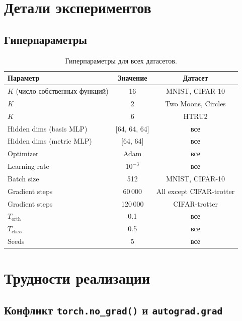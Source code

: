 \documentclass[14pt, a4paper, oneside]{extreport}
\theoremstyle{plain}
\theoremstyle{definition}
\begin{document}
\chapter{Детали экспериментов}
\label{app:experiments}

\section{Гиперпараметры}

\begin{table}[h]
  \centering
  \caption{Гиперпараметры для всех датасетов.}
  \begin{tabular}{lcc}
    \toprule
    Параметр & Значение & Датасет \\
    \midrule
    $K$ (число собственных функций) & 16 & MNIST, CIFAR-10 \\
    $K$ & 2 & Two Moons, Circles \\
    $K$ & 6 & HTRU2 \\
    Hidden dims (basis MLP) & [64, 64, 64] & все \\
    Hidden dims (metric MLP) & [64, 64] & все \\
    Optimizer & Adam & все \\
    Learning rate & $10^{-3}$ & все \\
    Batch size & 512 & MNIST, CIFAR-10 \\
    Gradient steps & 60\,000 & All except CIFAR-trotter \\
    Gradient steps & 120\,000 & CIFAR-trotter \\
    $T_{\text{orth}}$ & 0.1 & все \\
    $T_{\text{class}}$ & 0.5 & все \\
    Seeds & 5 & все \\
    \bottomrule
  \end{tabular}
\end{table}

\chapter{Трудности реализации}
\label{app:challenges}


\section{Конфликт \texttt{torch.no\_grad()} и \texttt{autograd.grad}}
\end{document}
